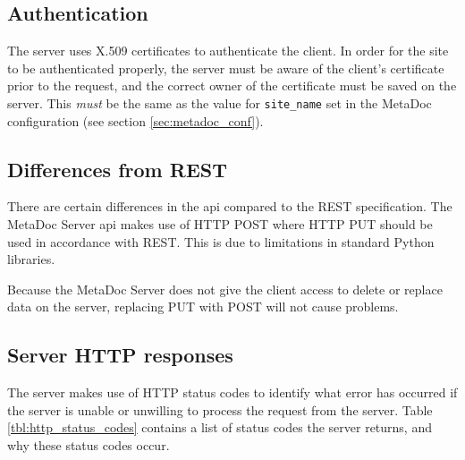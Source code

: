 \subsection{Authentication}
\label{sec:authentication}
The server uses X.509 certificates to authenticate the client. In order for the
site to be authenticated properly, the server must be aware of the client's
certificate prior to the request, and the correct owner of the certificate must
be saved on the server. This \textit{must} be the same as the value for
\texttt{site\_name} set in the MetaDoc configuration (see section
\ref{sec:metadoc_conf}).

\subsection{Differences from REST}
\label{sec:diff_from_rest}

There are certain differences in the \gls{api} compared to the REST
specification. The MetaDoc Server \gls{api} makes use of HTTP POST where HTTP
PUT should be used in accordance with REST. This is due to limitations in
standard Python libraries.

Because the MetaDoc Server does not give the client access to delete or replace
data on the server, replacing PUT with POST will not cause problems.

\subsection{Server HTTP responses}

The server makes use of HTTP status codes to identify what error has occurred
if the server is unable or unwilling to process the request from the server.
Table \ref{tbl:http_status_codes} contains a list of status codes the server
returns, and why these status codes occur. 

